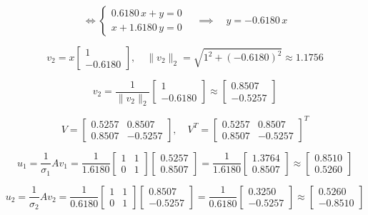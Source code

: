 \documentclass[12pt,a4paper]{article}
\begin{document}
\[
\Longleftrightarrow
\begin{cases}
0.6180\,x + y = 0 \\
x + 1.6180\,y = 0
\end{cases}
\quad \implies \quad y = -0.6180\,x
\]

\[
v_2 = x \begin{bmatrix} 1 \\ -0.6180 \end{bmatrix}, \quad
\|v_2\|_2 = \sqrt{1^2 + (-0.6180)^2} \approx 1.1756
\]

\[
v_2 = \frac{1}{\|v_2\|_2} \begin{bmatrix} 1 \\ -0.6180 \end{bmatrix} \approx
\begin{bmatrix} 0.8507 \\ -0.5257 \end{bmatrix}
\]

\[
V = \begin{bmatrix} 0.5257 & 0.8507 \\ 0.8507 & -0.5257 \end{bmatrix}, \quad
V^T = \begin{bmatrix} 0.5257 & 0.8507 \\ 0.8507 & -0.5257 \end{bmatrix}^T
\]

\[
u_1 = \frac{1}{\sigma_1} A v_1 =
\frac{1}{1.6180}
\begin{bmatrix} 1 & 1 \\ 0 & 1 \end{bmatrix}
\begin{bmatrix} 0.5257 \\ 0.8507 \end{bmatrix} =
\frac{1}{1.6180}
\begin{bmatrix} 1.3764 \\ 0.8507 \end{bmatrix} \approx
\begin{bmatrix} 0.8510 \\ 0.5260 \end{bmatrix}
\]

\[
u_2 = \frac{1}{\sigma_2} A v_2 =
\frac{1}{0.6180}
\begin{bmatrix} 1 & 1 \\ 0 & 1 \end{bmatrix}
\begin{bmatrix} 0.8507 \\ -0.5257 \end{bmatrix} =
\frac{1}{0.6180}
\begin{bmatrix} 0.3250 \\ -0.5257 \end{bmatrix} \approx
\begin{bmatrix} 0.5260 \\ -0.8510 \end{bmatrix}
\]
\end{document}
